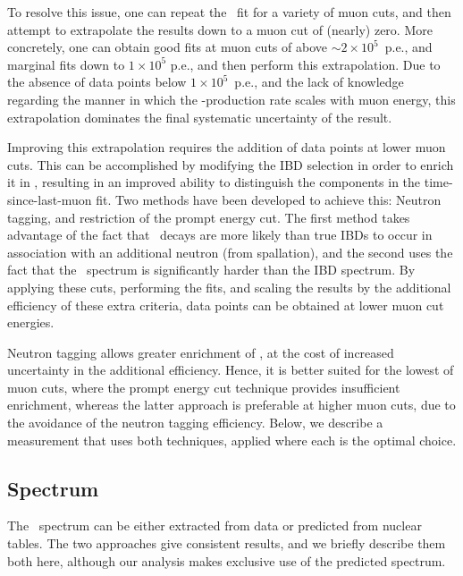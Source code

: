 \documentclass[../thesis.tex]{subfiles}
\begin{document}
To resolve this issue, one can repeat the \linine\ fit for a variety of muon cuts, and then attempt to extrapolate the results down to a muon cut of (nearly) zero. More concretely, one can obtain good fits at muon cuts of above $\sim 2\times10^5$~p.e., and marginal fits down to $1\times10^5$ p.e., and then perform this extrapolation. Due to the absence of data points below $1\times10^5$~p.e., and the lack of knowledge regarding the manner in which the \linine-production rate scales with muon energy, this extrapolation dominates the final systematic uncertainty of the result.

Improving this extrapolation requires the addition of data points at lower muon cuts. This can be accomplished by modifying the IBD selection in order to enrich it in \linine, resulting in an improved ability to distinguish the components in the time-since-last-muon fit. Two methods have been developed to achieve this: Neutron tagging, and restriction of the prompt energy cut. The first method takes advantage of the fact that \linine\ decays are more likely than true IBDs to occur in association with an additional neutron (from spallation), and the second uses the fact that the \linine\ spectrum is significantly harder than the IBD spectrum. By applying these cuts, performing the fits, and scaling the results by the additional efficiency of these extra criteria, data points can be obtained at lower muon cut energies.

Neutron tagging allows greater enrichment of \linine, at the cost of increased uncertainty in the additional efficiency. Hence, it is better suited for the lowest of muon cuts, where the prompt energy cut technique provides insufficient enrichment, whereas the latter approach is preferable at higher muon cuts, due to the avoidance of the neutron tagging efficiency. Below, we describe a measurement that uses both techniques, applied where each is the optimal choice.

\subsection{Spectrum}
\label{sec:bkgLi9Spectrum}

The \LiHe\ spectrum can be either extracted from data or predicted from nuclear tables. The two approaches give consistent results, and we briefly describe them both here, although our analysis makes exclusive use of the predicted spectrum.
\end{document}
